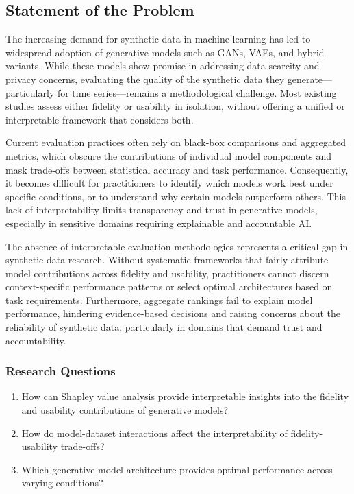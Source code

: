 \documentclass{article}
\begin{document}
\subsection{Statement of the Problem}

The increasing demand for synthetic data in machine learning has led to widespread adoption of generative models such as GANs, VAEs, and hybrid variants. While these models show promise in addressing data scarcity and privacy concerns, evaluating the quality of the synthetic data they generate—particularly for time series—remains a methodological challenge. Most existing studies assess either fidelity or usability in isolation, without offering a unified or interpretable framework that considers both.

Current evaluation practices often rely on black-box comparisons and aggregated metrics, which obscure the contributions of individual model components and mask trade-offs between statistical accuracy and task performance. Consequently, it becomes difficult for practitioners to identify which models work best under specific conditions, or to understand why certain models outperform others. This lack of interpretability limits transparency and trust in generative models, especially in sensitive domains requiring explainable and accountable AI.

The absence of interpretable evaluation methodologies represents a critical gap in synthetic data research. Without systematic frameworks that fairly attribute model contributions across fidelity and usability, practitioners cannot discern context-specific performance patterns or select optimal architectures based on task requirements. Furthermore, aggregate rankings fail to explain model performance, hindering evidence-based decisions and raising concerns about the reliability of synthetic data, particularly in domains that demand trust and accountability.

\subsubsection{Research Questions}
\begin{enumerate}
    \item How can Shapley value analysis provide interpretable insights into the fidelity and usability contributions of generative models?
    \item How do model-dataset interactions affect the interpretability of fidelity-usability trade-offs?
    \item Which generative model architecture provides optimal performance across varying conditions?
\end{enumerate}
\end{document}
